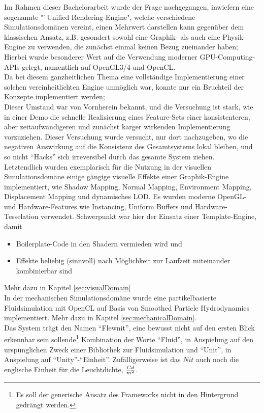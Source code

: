 

Im Rahmen dieser Bachelorarbeit wurde der Frage nachgegangen, inwiefern eine sogenannte "`Unified Rendering-Engine", welche verschiedene Simulationsdomänen vereint, einen Mehrwert darstellen kann gegenüber dem klassischen Ansatz, z.B. gesondert sowohl eine Graphik- als auch eine Physik-Engine zu verwenden, die zunächst einmal keinen
Bezug zueinander haben;\\

Hierbei wurde besonderer Wert auf die Verwendung moderner GPU-Computing-APIs gelegt, namentlich auf OpenGL3/4 und OpenCL.\\
Da bei diesem ganzheitlichen Thema eine vollständige Implementierung einer solchen vereinheitlichten Engine unmöglich war,
konnte nur ein Bruchteil der Konzepte implementiert werden;\\

Dieser Umstand war von Vornherein bekannt, und die Versuchung ist stark, wie in einer Demo die schnelle Realisierung eines Feature-Sets einer konsistenteren, aber zeitaufwändigeren und zunächst karger wirkenden Implementierung vorzuziehen.
Dieser Versuchung wurde versucht, nur dort nachzugeben, wo die negativen Auswirkung auf die Konsistenz des Gesamtsystems lokal bleiben, und so nicht "`Hacks"' sich irreversibel durch das gesamte System ziehen.\\

Letztendlich wurden exemplarisch für die Nutzung in  der visuellen Simulationsdomäne einige gängige visuelle Effekte einer Graphik-Engine implementiert, wie  Shadow Mapping, Normal Mapping, Environment Mapping, Displacement Mapping und dynamisches LOD. Es wurden moderne OpenGL- und Hardware-Features wie Instancing, Uniform Buffers und Hardware-Tesselation verwendet. Schwerpunkt war hier der Einsatz einer Template-Engine, damit
\begin{itemize}
	\item Boilerplate-Code in den Shadern vermieden wird und
	\item Effekte beliebig (sinnvoll) nach Möglichkeit zur Laufzeit miteinander kombinierbar sind
\end{itemize}
Mehr dazu in Kapitel \ref{sec:visualDomain}\\
In der mechanischen Simulationsdomäne wurde eine partikelbasierte Fluidsimulation mit OpenCL auf Basis von Smoothed Particle Hydrodynamics implementiert. Mehr dazu in Kapitel \ref{sec:mechanicalDomain}.\\

Das System trägt den Namen "`Flewnit"', eine bewusst nicht auf den ersten Blick erkennbar sein sollende\footnote{Es soll der generische Ansatz des Frameworks nicht in den Hintergrund gedrängt werden.} Kombination der Worte "`Fluid"', in Anspielung auf den urspünglichen Zweck einer Bibliothek zur Fluidsimulation und "`Unit"', in Anspielung auf "`Unity"'-"`Einheit"'. Zufälligerweise ist das $Nit$ auch noch die englische Einheit für die Leuchtdichte, $Cd \over m^2$.


